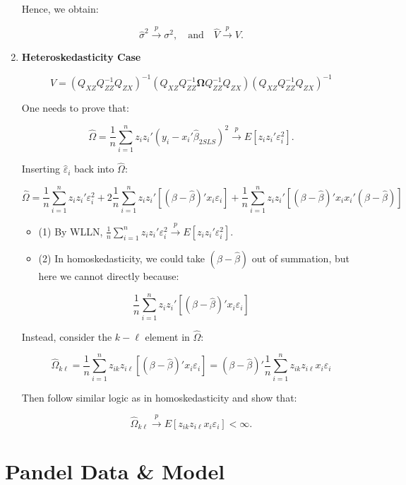 \documentclass[12pt, oneside]{article}
\begin{document}
\begin{enumerate}
Hence, we obtain:

\[
\hat{\sigma}^2 \xrightarrow{p} \sigma^2, \quad \text{and} \quad \hat{V} \xrightarrow{p} V.
\]

\item \textbf{Heteroskedasticity Case}

\[
V = (Q_{XZ} Q_{ZZ}^{-1} Q_{ZX})^{-1} (Q_{XZ} Q_{ZZ}^{-1} \mathbf{\Omega} Q_{ZZ}^{-1} Q_{ZX}) (Q_{XZ} Q_{ZZ}^{-1} Q_{ZX})^{-1}
\]

One needs to prove that:

\[
\hat{\Omega} = \frac{1}{n} \sum_{i=1}^{n} z_i z_i' (y_i - x_i' \hat{\beta}_{2SLS})^2 \xrightarrow{p} E[z_i z_i' \varepsilon_i^2].
\]

Inserting \( \hat{\varepsilon}_i \) back into \( \hat{\Omega} \):

\[
\hat{\Omega} = \frac{1}{n} \sum_{i=1}^{n} z_i z_i' \varepsilon_i^2 + 2 \frac{1}{n} \sum_{i=1}^{n} z_i z_i' [( \beta - \hat{\beta})' x_i \varepsilon_i] + \frac{1}{n} \sum_{i=1}^{n} z_i z_i' [( \beta - \hat{\beta})' x_i x_i' ( \beta - \hat{\beta})]
\]

\begin{itemize}
    \item (1) By WLLN, \( \frac{1}{n} \sum_{i=1}^{n} z_i z_i' \varepsilon_i^2 \xrightarrow{p} E[z_i z_i' \varepsilon_i^2] \).
    \item (2) In homoskedasticity, we could take \( (\beta - \hat{\beta}) \) out of summation, but here we cannot directly because:
\end{itemize}

\[
\frac{1}{n} \sum_{i=1}^{n} z_i z_i' \left[ (\beta - \hat{\beta})' x_i \varepsilon_i \right]
\]

Instead, consider the \( k - \ell \) element in \( \hat{\Omega} \):

\[
\hat{\Omega}_{k\ell} = \frac{1}{n} \sum_{i=1}^{n} z_{ik} z_{i\ell} [(\beta - \hat{\beta})' x_i \varepsilon_i] = (\beta - \hat{\beta})' \frac{1}{n} \sum_{i=1}^{n} z_{ik} z_{i\ell} x_i \varepsilon_i
\]

Then follow similar logic as in homoskedasticity and show that:

\[
\hat{\Omega}_{k\ell} \xrightarrow{p} E[z_{ik} z_{i\ell} x_i \varepsilon_i] < \infty.
\]
\end{enumerate}

\section{Pandel Data \& Model}
\end{document}
